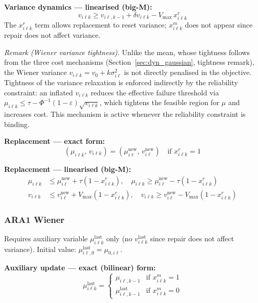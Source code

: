 \documentclass[11pt,a4paper]{article}
\begin{document}
\textbf{Variance dynamics --- linearised (big-M):}
\begin{equation}
  v_{i\ell k} \geq v_{i\ell,k-1} + \delta v_{i\ell k} - V_{\max}\,x^r_{i\ell k}
\end{equation}
The $x^r_{i\ell k}$ term allows replacement to reset variance; $x^m_{i\ell k}$
does not appear since repair does not affect variance.

\emph{Remark (Wiener variance tightness).}
Unlike the mean, whose tightness follows from the three cost mechanisms
(Section~\ref{sec:dyn_gaussian}, tightness remark), the Wiener variance
$v_{i\ell k} = v_0 + k\sigma^2_{i\ell}$ is not directly penalised in the objective.
Tightness of the variance relaxation is enforced indirectly by the reliability
constraint: an inflated $v_{i\ell k}$ reduces the effective failure threshold via
$\mu_{i\ell k} \leq \tau - \Phi^{-1}(1-\varepsilon)\sqrt{v_{i\ell k}}$, which
tightens the feasible region for $\mu$ and increases cost. This mechanism is active
whenever the reliability constraint is binding.

\textbf{Replacement --- exact form:}
\begin{equation}
  (\mu_{i\ell k},\, v_{i\ell k}) = (\mu^{\mathrm{new}}_{i\ell},\, v^{\mathrm{new}}_{i\ell})
  \quad \text{if } x^r_{i\ell k} = 1
\end{equation}

\textbf{Replacement --- linearised (big-M):}
\begin{align}
  \mu_{i\ell k} &\leq \mu^{\mathrm{new}}_{i\ell} + \tau(1-x^r_{i\ell k}), \quad
  \mu_{i\ell k} \geq \mu^{\mathrm{new}}_{i\ell} - \tau(1-x^r_{i\ell k}) \\
  v_{i\ell k} &\leq v^{\mathrm{new}}_{i\ell} + V_{\max}(1-x^r_{i\ell k}), \quad
  v_{i\ell k} \geq v^{\mathrm{new}}_{i\ell} - V_{\max}(1-x^r_{i\ell k})
\end{align}

\subsubsection{ARA1 Wiener}

Requires auxiliary variable $\mu^{\mathrm{last}}_{i\ell k}$ only
(no $v^{\mathrm{last}}_{i\ell k}$ since repair does not affect variance).
Initial value: $\mu^{\mathrm{last}}_{i\ell,0} = \mu_{0,i\ell}$.

\textbf{Auxiliary update --- exact (bilinear) form:}
\begin{equation}
  \mu^{\mathrm{last}}_{i\ell k} = \begin{cases}
    \mu_{i\ell,k-1} & \text{if } x^m_{i\ell k} = 1 \\
    \mu^{\mathrm{last}}_{i\ell,k-1} & \text{if } x^m_{i\ell k} = 0
  \end{cases}
\end{equation}
\end{document}
